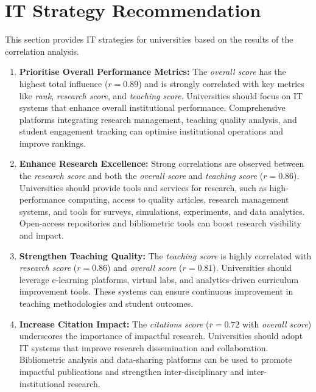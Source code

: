 \documentclass[sigconf]{acmart}
\begin{document}
\section{IT Strategy Recommendation}

This section provides IT strategies for universities based on the results of the correlation analysis.

\begin{enumerate}
	\item \textbf{Prioritise Overall Performance Metrics:} The \textit{overall score} has the highest total influence (\(r = 0.89\)) and is strongly correlated with key metrics like \textit{rank}, \textit{research score}, and \textit{teaching score}. Universities should focus on IT systems that enhance overall institutional performance. Comprehensive platforms integrating research management, teaching quality analysis, and student engagement tracking can optimise institutional operations and improve rankings.
	

	\item \textbf{Enhance Research Excellence:} Strong correlations are observed between the \textit{research score} and both the \textit{overall score} and \textit{teaching score} (\(r = 0.86\)). Universities should provide tools and services for research, such as high-performance computing, access to quality articles, research management systems, and tools for surveys, simulations, experiments, and data analytics. Open-access repositories and bibliometric tools can boost research visibility and impact.
	
	\item \textbf{Strengthen Teaching Quality:} The \textit{teaching score} is highly correlated with \textit{research score} (\(r = 0.86\)) and \textit{overall score} (\(r = 0.81\)). Universities should leverage e-learning platforms, virtual labs, and analytics-driven curriculum improvement tools. These systems can ensure continuous improvement in teaching methodologies and student outcomes.
	
	\item \textbf{Increase Citation Impact:} The \textit{citations score} (\(r = 0.72\) with \textit{overall score}) underscores the importance of impactful research. Universities should adopt IT systems that improve research dissemination and collaboration. Bibliometric analysis and data-sharing platforms can be used to promote impactful publications and strengthen inter-disciplinary and inter-institutional research.
	

\end{enumerate}
\end{document}
